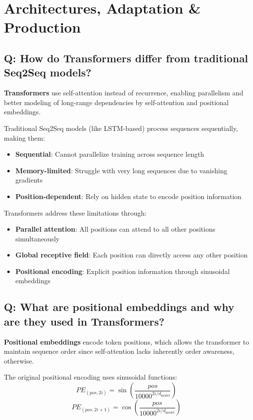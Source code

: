 \section{Architectures, Adaptation \& Production}

\subsection*{Q: How do Transformers differ from traditional Seq2Seq models?}
\textbf{Transformers} use self-attention instead of recurrence, enabling parallelism and better modeling of long-range dependencies by self-attention and positional embeddings.

Traditional Seq2Seq models (like LSTM-based) process sequences sequentially, making them:
\begin{itemize}
	\item \textbf{Sequential}: Cannot parallelize training across sequence length
	\item \textbf{Memory-limited}: Struggle with very long sequences due to vanishing gradients
	\item \textbf{Position-dependent}: Rely on hidden state to encode position information
\end{itemize}

Transformers address these limitations through:
\begin{itemize}
	\item \textbf{Parallel attention}: All positions can attend to all other positions simultaneously
	\item \textbf{Global receptive field}: Each position can directly access any other position
	\item \textbf{Positional encoding}: Explicit position information through sinusoidal embeddings
\end{itemize}

\subsection*{Q: What are positional embeddings and why are they used in Transformers?}
\textbf{Positional embeddings} encode token positions, which allows the transformer to maintain sequence order since self-attention lacks inherently order awareness, otherwise.

The original positional encoding uses sinusoidal functions:
\[
PE_{(pos, 2i)} = \sin\left(\frac{pos}{10000^{2i/d_{\text{model}}}}\right)
\]
\[
PE_{(pos, 2i+1)} = \cos\left(\frac{pos}{10000^{2i/d_{\text{model}}}}\right)
\]

